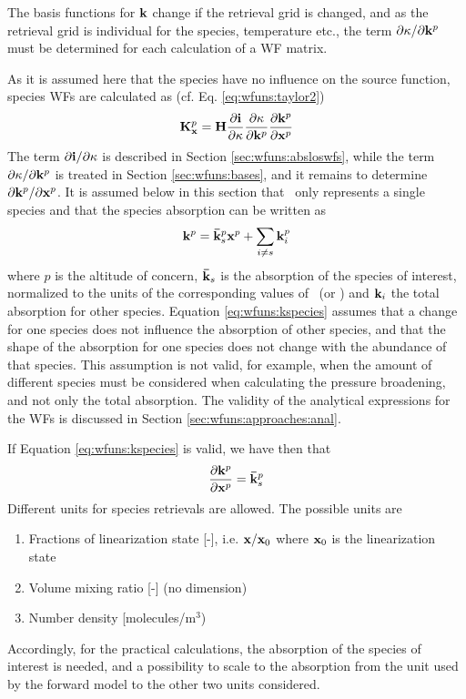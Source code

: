  The basis functions for $\mathbf{k}$ change if the retrieval grid is
 changed, and as the retrieval grid is individual for the species, 
 temperature etc., the term $\partial\kappa/ \partial \mathbf{k}^p$ 
 must be determined for each calculation of a WF matrix.


 \label{sec:wfuns:species}
 
 As it is assumed here that the species have no influence on
 the source function, species WFs are calculated as (cf. Eq.
 \ref{eq:wfuns:taylor2})
 \begin{equation}
    \mathbf{K}_{\mathbf{x}}^p = \mathbf{H}
                 \frac{\partial\mathbf{i}}{\partial \kappa}
                 \frac{\partial \kappa}{\partial \mathbf{k}^p}
                 \frac{\partial \mathbf{k}^p}{\partial \mathbf{x}^p}
  \label{eq:wfuns:species}
 \end{equation}
 The term $\partial\mathbf{i} / \partial \kappa$ is described in Section
 \ref{sec:wfuns:absloswfs}, while the term $\partial \kappa /\partial
 \mathbf{k}^p$ is treated in Section \ref{sec:wfuns:bases}, and it
 remains to determine $\partial \mathbf{k}^p / \partial \mathbf{x}^p$. It is
 assumed below in this section that \xt\ only represents a single 
 species and that the species absorption can be written as
 \begin{equation}
   \mathbf{k}^p = \mathbf{\bar{k}}^p_s \mathbf{x}^p + \sum_{i\ne s} \mathbf{k}^p_i
  \label{eq:wfuns:kspecies}
 \end{equation}
 where $p$ is the altitude of concern, $\mathbf{\bar{k}}_s$ is the
 absorption of the species of interest, normalized to the units of the
 corresponding values of \xt\ (or \bt) and $\mathbf{k}_i$ the total
 absorption for other species. Equation \ref{eq:wfuns:kspecies}
 assumes that a change for one species does not influence the
 absorption of other species, and that the shape of the absorption for
 one species does not change with the abundance of that species.  This
 assumption is not valid, for example, when the amount of different
 species must be considered when calculating the pressure broadening,
 and not only the total absorption. The validity of the analytical
 expressions for the WFs is discussed in Section
 \ref{sec:wfuns:approaches:anal}.

 If Equation \ref{eq:wfuns:kspecies} is valid, we have then that
 \begin{equation}
   \frac{\partial \mathbf{k}^p}{\partial \mathbf{x}^p} = \mathbf{\bar{k}}^p_s
  \label{eq:wfuns:dkspecies}
 \end{equation}
 Different units for species retrievals are allowed. The possible units are
 \begin{enumerate}
    \item Fractions of linearization state [-], i.e. $\mathbf{x}/\mathbf{x}_0$ where
          $\mathbf{x}_0$ is the linearization state 
    \item Volume mixing ratio [-] (no dimension)
    \item Number density [molecules/m$^3$)
 \end{enumerate}
 Accordingly, for the practical calculations, the absorption of the
 species of interest is needed, and a possibility to scale to the
 absorption from the unit used by the forward model to the other two
 units considered.
 
